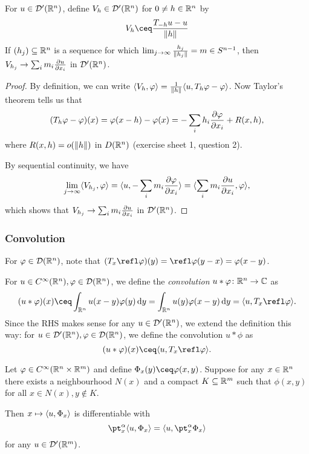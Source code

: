 \begin{lemma}
    For $u \in \mathcal D'(\mathbb R^n)$, define $V_h \in \mathcal D'(\mathbb R^n)$ for $0 \neq h \in \mathbb R^n$ by
    \[
    V_h \ceq \frac{T_{-h}u - u}{\norm{h}}
    \]
    If $(h_j) \subseteq \mathbb R^n$ is a sequence for which $\lim_{j \to \infty} \frac{h_j}{\norm{h_j}} = m \in S^{n-1}$, then $V_{h_j} \to \sum_i m_i \pdv{u}{x_i}$ in $\mathcal D'(\mathbb R^n)$. 
\end{lemma}

\begin{proof}
    By definition, we can write $\langle V_h, \varphi\rangle = \frac{1}{\norm{h}} \langle u, T_h\varphi - \varphi\rangle$. Now Taylor's theorem tells us that
    \[
    (T_h\varphi - \varphi)(x) = \varphi(x - h) - \varphi(x) = - \sum_i h_i \pdv{\varphi}{x_i}(x) + R(x, h),
    \]
    where $R(x, h) = o(\norm{h})$ in $D(\mathbb R^n)$ (exercise sheet 1, question 2). 
    
    By sequential continuity, we have
    \[
    \lim_{j \to \infty} \langle V_{h_j}, \varphi\rangle = \langle u, - \sum_i m_i \pdv{\varphi}{x_i}\rangle = \langle\sum_i m_i \pdv{u}{x_i}, \varphi\rangle, 
    \]
    which shows that $V_{h_j} \to \sum_i m_i \pdv{u}{x_i}$ in $\mathcal D'(\mathbb R^n)$. 
\end{proof}

\subsubsection{Convolution}
For $\varphi \in \mathcal D(\mathbb R^n)$, note that $(T_x \refl\phi)(y) = \refl\phi(y-x) = \phi(x-y)$. 
\begin{definition}
    For $u \in C^\infty(\mathbb R^n), \varphi \in \mathcal D(\mathbb R^n)$, we define the \emph{convolution} $u * \varphi \colon \mathbb R^n \to \mathbb C$ as
    \[
    (u * \phi)(x) \ceq \int_{\RR^n} u(x-y) \phi(y) \dd{y} = \int_{\RR^n} u(y) \phi(x - y) \dd{y} = \ang{u, T_x \refl\phi}. 
    \]
    Since the RHS makes sense for any $u \in \mathcal D'(\mathbb R^n)$, we extend the definition this way: for $u \in \mathcal D'(\mathbb R^n), \varphi \in \mathcal D(\mathbb R^n)$, we define the convolution $u * \phi$ as
    \[
    (u * \phi)(x) \ceq \ang{u, T_x\refl\phi}. 
    \]
\end{definition}


\begin{lemma}
    Let $\varphi \in C^\infty(\mathbb R^n \times \mathbb R^m)$ and define $\Phi_x(y) \ceq \phi(x, y)$. Suppose for any $x \in \mathbb R^n$ there exists a neighbourhood $N(x)$ and a compact $K \subseteq \mathbb R^m$ such that $\phi(x, y)$ for all $x \in N(x), y \notin K$. 
    
    Then $x \mapsto \langle u, \Phi_x\rangle$ is differentiable with
    \[
    \pt_x^\alpha \ang{u, \Phi_x} = \ang{u, \pt_x^\alpha \Phi_x}
    \]
    for any $u \in \mathcal D'(\mathbb R^m)$. 
\end{lemma}

